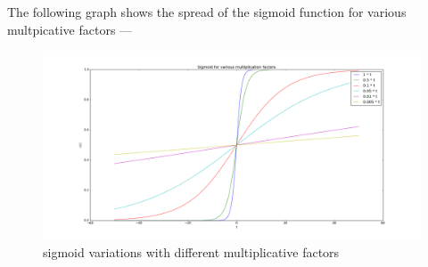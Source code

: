 \documentclass{article}
\begin{document}
The following graph shows the spread of the sigmoid function for various multpicative factors ---
\begin{figure}[ht!]
  \centering
  \includegraphics[width=1\textwidth]{sigmoidVariations}
  \caption{sigmoid variations with different multiplicative factors\label{fig:sigmoid}}
\end{figure}
\end{document}
